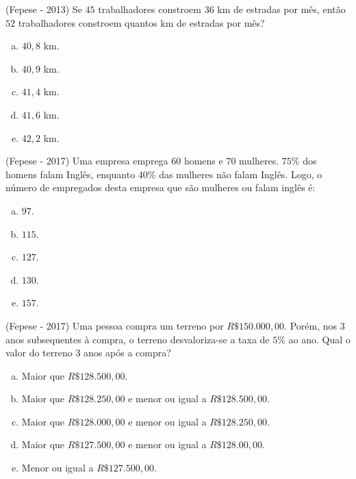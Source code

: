  \begin{exer}
 (Fepese - 2013) Se $45$ trabalhadores constroem $36$ km de estradas por mês, então $52$ trabalhadores constroem quantos km de estradas por mês?
 \begin{enumerate}[a)]
   \item $40,8$ km.
   \item $40,9$ km.
   \item $41,4$ km.
   \item $41,6$ km.
   \item $42,2$ km.
   \end{enumerate}
 \end{exer} 
 
 \begin{exer}
 (Fepese - 2017) Uma empresa emprega $60$ homens e $70$ mulheres. $75\%$ dos homens falam Inglês, enquanto $40\%$ das mulheres não falam Inglês. Logo, o número de empregados desta empresa que são mulheres ou falam inglês é:
 \begin{enumerate}[a)]
   \item $97$.
   \item $115$.
   \item $127$.
   \item $130$.
   \item $157$.
   \end{enumerate}
 \end{exer} 
 
 \begin{exer}
 (Fepese - 2017) Uma pessoa compra um terreno por $R\$ 150.000,00$. Porém, nos $3$ anos subsequentes à compra, o terreno desvaloriza-se a taxa de $5\%$ ao ano. Qual o valor do terreno $3$ anos após a compra?
  \begin{enumerate}[a)]
   \item Maior que $R\$ 128.500,00$.
   \item Maior que $R\$ 128.250,00$ e menor ou igual a $R\$128.500,00$.
   \item Maior que $R\$ 128.000,00$ e menor ou igual a $R\$128.250,00$.
   \item Maior que $R\$ 127.500,00$ e menor ou igual a $R\$128.00,00$.
   \item Menor ou igual a $R\$ 127.500,00$.
   \end{enumerate}
 \end{exer} 
 
